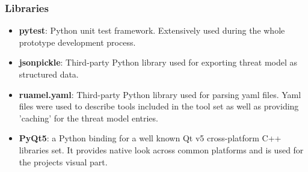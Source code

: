 \subsubsection{Libraries}
\begin{itemize}
	\item \textbf{pytest}: Python unit test framework. Extensively used during the whole prototype development process.
	\item \textbf{jsonpickle}: Third-party Python library used for exporting threat model as structured data.
	\item \textbf{ruamel.yaml}: Third-party Python library used for parsing yaml files. Yaml files were used to describe tools included in the tool set as well as providing 'caching' for the threat model entries. 
	\item \textbf{PyQt5}: a Python binding for a well known Qt v5 cross-platform C++ libraries set. It provides native look across common platforms and is used for the projects visual part. 
\end{itemize}


